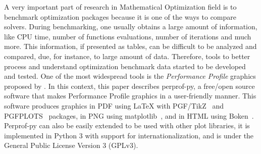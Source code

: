 A very important part of research in Mathematical Optimization field is to benchmark
optimization packages because it is one of the ways to compare
solvers.
During benchmarking, one usually
obtains a large amount of information, like CPU time, number of functions
evaluations, number of iterations and much more. This information, if
presented as tables, can be difficult to be analyzed and compared, due, for instance, to
large amount of data.  Therefore, 
tools to better process and understand optimization benchmark data  started to be developed and tested. One of
the most widespread tools  is the \emph{Performance Profile} graphics proposed by
\textcite{Dolan:2002du}. In this context, this paper describes  perprof-py, a free/open source software
that makes Performance Profile graphics in a user-friendly manner. This software produces graphics in PDF using LaTeX with
PGF/TikZ~\cite{TikZ} and PGFPLOTS~\cite{pgfplots} packages, in
PNG using matplotlib~\cite{Hunter:2007}, and in HTML using
Boken~\cite{url:bokeh}. Perprof-py  can also be easily
extended to be used with other plot libraries,  it is implemented
in Python 3 with support for internationalization, and is under the General
Public License Version 3 (GPLv3).
